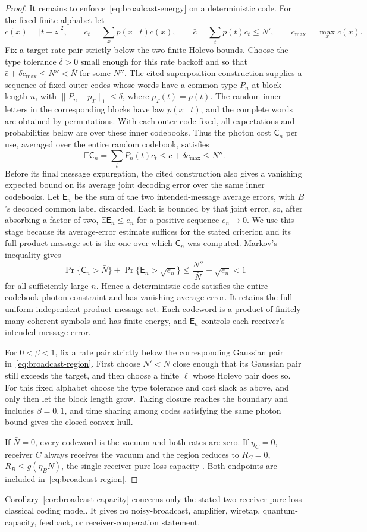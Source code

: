 \begin{proof}
It remains to enforce~\eqref{eq:broadcast-energy} on a deterministic
code. For the fixed finite alphabet let
\[
 c(x)=|t+z|^2,\qquad
 c_t=\sum_xp(x\mid t)c(x),\qquad
 \bar c=\sum_t p(t)c_t\le N',\qquad
 c_{\max}=\max_x c(x).
\]
Fix a target rate pair strictly below the two finite Holevo bounds.
Choose the type tolerance \(\delta>0\) small enough for this rate
backoff and so that
\(\bar c+\delta c_{\max}\le N''<\bar N\) for some \(N''\).
The cited superposition construction supplies a sequence of fixed outer
codes whose words have a common type \(P_n\) at block length \(n\), with
\(\|P_n-p_T\|_1\le\delta\), where \(p_T(t)=p(t)\).
The random inner letters in the corresponding blocks have law
\(p(x\mid t)\), and the complete words are obtained by permutations.
With each outer code fixed, all expectations and probabilities below
are over these inner codebooks. Thus the photon cost \(\mathsf C_n\)
per use, averaged over the entire random codebook, satisfies
\[
 \mathbb E\mathsf C_n=\sum_tP_n(t)c_t
 \le\bar c+\delta c_{\max}\le N''.
\]
Before its final message expurgation, the cited construction also gives
a vanishing expected bound on its average joint decoding error over the
same inner codebooks. Let \(\mathsf E_n\) be the sum of the two
intended-message average errors, with \(B\)'s decoded common label
discarded. Each is bounded by that joint error, so, after absorbing a
factor of two, \(\mathbb E\mathsf E_n\le e_n\) for a positive sequence
\(e_n\to0\). We use this stage because its average-error estimate
suffices for the stated criterion and its full product message set is
the one over which \(\mathsf C_n\) was computed. Markov's inequality gives
\[
 \Pr\{\mathsf C_n>\bar N\}
 +\Pr\{\mathsf E_n>\sqrt{e_n}\}
 \le\frac{N''}{\bar N}+\sqrt{e_n}<1
\]
for all sufficiently large \(n\). Hence a deterministic code satisfies
the entire-codebook photon constraint and has vanishing average error.
It retains the full uniform independent product message set. Each
codeword is a product of finitely many coherent symbols and has finite
energy, and \(\mathsf E_n\) controls each receiver's intended-message
error.

For \(0<\beta<1\), fix a rate pair strictly below the corresponding
Gaussian pair in~\eqref{eq:broadcast-region}. First choose
\(N'<\bar N\) close enough that its Gaussian pair still exceeds the
target, and then choose a finite \(\ell\) whose Holevo pair does so.
For this fixed alphabet choose the type tolerance and cost slack as
above, and only then let the block length grow. Taking closure reaches
the boundary and includes \(\beta=0,1\), and time sharing
among codes satisfying the same photon bound gives the closed convex
hull.

If \(\bar N=0\), every codeword is the vacuum and both rates are zero.
If \(\eta_C=0\), receiver \(C\) always receives the vacuum and the
region reduces to \(R_C=0\), \(R_B\le g(\eta_B\bar N)\), the
single-receiver pure-loss capacity \cite{GGLMSY2004}. Both endpoints
are included in~\eqref{eq:broadcast-region}.
\end{proof}

Corollary~\ref{cor:broadcast-capacity} concerns only the stated
two-receiver pure-loss classical coding model. It gives no
noisy-broadcast, amplifier, wiretap, quantum-capacity, feedback, or
receiver-cooperation statement.
